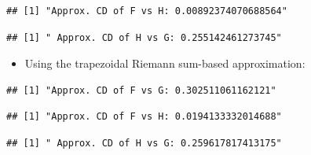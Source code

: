 \documentclass[
]{article}
\providecommand{\tightlist}{%
  \setlength{\itemsep}{0pt}\setlength{\parskip}{0pt}}
\begin{document}
\begin{verbatim}
## [1] "Approx. CD of F vs H: 0.00892374070688564"
\end{verbatim}

\begin{verbatim}
## [1] " Approx. CD of H vs G: 0.255142461273745"
\end{verbatim}

\begin{itemize}
\tightlist
\item
  Using the trapezoidal Riemann sum-based approximation:
\end{itemize}

\begin{verbatim}
## [1] "Approx. CD of F vs G: 0.302511061162121"
\end{verbatim}

\begin{verbatim}
## [1] "Approx. CD of F vs H: 0.0194133332014688"
\end{verbatim}

\begin{verbatim}
## [1] " Approx. CD of H vs G: 0.259617817413175"
\end{verbatim}
\end{document}
